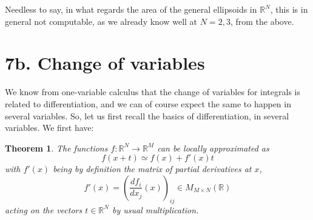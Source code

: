 \documentclass[12pt]{amsbook}
\newtheorem{theorem}{Theorem}[chapter]
\begin{document}
Needless to say, in what regards the area of the general ellipsoids in $\mathbb R^N$, this is in general not computable, as we already know well at $N=2,3$, from the above.

\section*{7b. Change of variables}

We know from one-variable calculus that the change of variables for integrals is related to differentiation, and we can of course expect the same to happen in several variables. So, let us first recall the basics of differentiation, in several variables. We first have:


\begin{theorem}
The functions $f:\mathbb R^N\to\mathbb R^M$ can be locally approximated as
$$f(x+t)\simeq f(x)+f'(x)t$$
with $f'(x)$ being by definition the matrix of partial derivatives at $x$, 
$$f'(x)=\left(\frac{df_i}{dx_j}(x)\right)_{ij}\in M_{M\times N}(\mathbb R)$$ 
acting on the vectors $t\in\mathbb R^N$ by usual multiplication.
\end{theorem}
\end{document}
